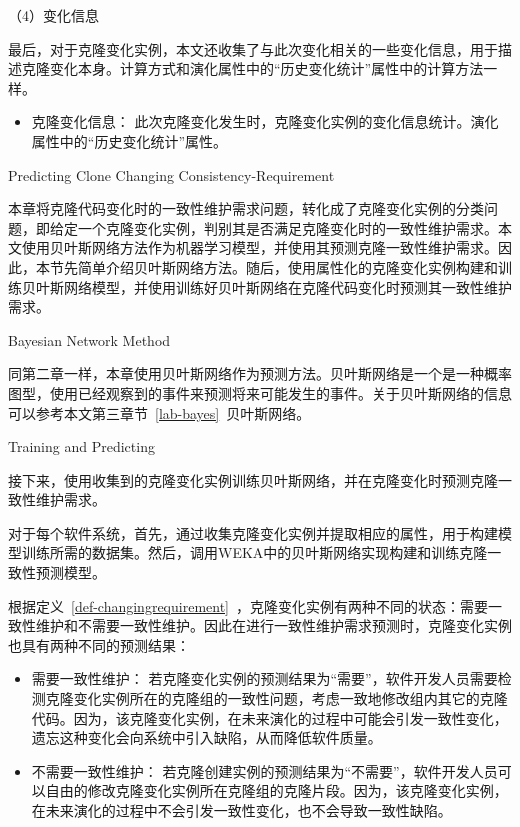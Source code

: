 （4）变化信息

最后，对于克隆变化实例，本文还收集了与此次变化相关的一些变化信息，用于描述克隆变化本身。计算方式和演化属性中的“历史变化统计”属性中的计算方法一样。

\begin {itemize}
\item
克隆变化信息：
此次克隆变化发生时，克隆变化实例的变化信息统计。演化属性中的“历史变化统计”属性。
\end {itemize}



{Predicting Clone Changing Consistency-Requirement} 

本章将克隆代码变化时的一致性维护需求问题，转化成了克隆变化实例的分类问题，即给定一个克隆变化实例，判别其是否满足克隆变化时的一致性维护需求。本文使用贝叶斯网络方法作为机器学习模型，并使用其预测克隆一致性维护需求。因此，本节先简单介绍贝叶斯网络方法。随后，使用属性化的克隆变化实例构建和训练贝叶斯网络模型，并使用训练好贝叶斯网络在克隆代码变化时预测其一致性维护需求。

{Bayesian Network Method} 

同第二章一样，本章使用贝叶斯网络作为预测方法。贝叶斯网络是一个是一种概率图型，使用已经观察到的事件来预测将来可能发生的事件\cite{friedman1997bayesian}。关于贝叶斯网络的信息可以参考本文第三章节~\ref{lab-bayes}~贝叶斯网络。

{Training and Predicting}


接下来，使用收集到的克隆变化实例训练贝叶斯网络，并在克隆变化时预测克隆一致性维护需求。

对于每个软件系统，首先，通过收集克隆变化实例并提取相应的属性，用于构建模型训练所需的数据集。然后，调用WEKA中的贝叶斯网络实现构建和训练克隆一致性预测模型。

根据定义~\ref{def-changingrequirement}~，克隆变化实例有两种不同的状态：需要一致性维护和不需要一致性维护。因此在进行一致性维护需求预测时，克隆变化实例也具有两种不同的预测结果：
\begin{itemize}
\item 
需要一致性维护：
若克隆变化实例的预测结果为“需要”，软件开发人员需要检测克隆变化实例所在的克隆组的一致性问题，考虑一致地修改组内其它的克隆代码。因为，该克隆变化实例，在未来演化的过程中可能会引发一致性变化，遗忘这种变化会向系统中引入缺陷，从而降低软件质量。
\item
不需要一致性维护：
若克隆创建实例的预测结果为“不需要”，软件开发人员可以自由的修改克隆变化实例所在克隆组的克隆片段。因为，该克隆变化实例，在未来演化的过程中不会引发一致性变化，也不会导致一致性缺陷。
\end{itemize}

